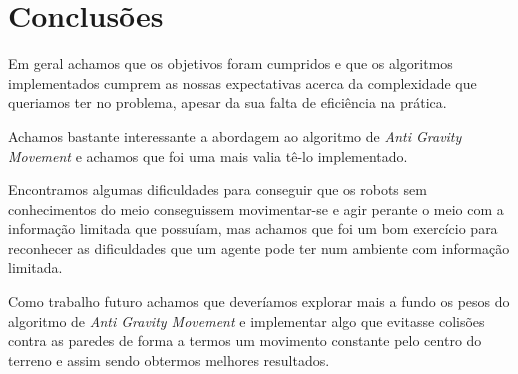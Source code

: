\chapter{Conclusões}

Em geral achamos que os objetivos foram cumpridos e que os algoritmos implementados cumprem as nossas expectativas acerca da complexidade que queriamos ter no problema, apesar da sua falta de eficiência na prática.

Achamos bastante interessante a abordagem ao algoritmo de \textit{Anti Gravity Movement} e achamos que foi uma mais valia tê-lo implementado.

Encontramos algumas dificuldades para conseguir que os robots sem conhecimentos do meio conseguissem movimentar-se e agir perante o meio com a informação limitada que possuíam, mas achamos que foi um bom exercício para reconhecer as dificuldades que um agente pode ter num ambiente com informação limitada.

Como trabalho futuro achamos que deveríamos explorar mais a fundo os pesos do algoritmo de \textit{Anti Gravity Movement} e implementar algo que evitasse colisões contra as paredes de forma a termos um movimento constante pelo centro do terreno e assim sendo obtermos melhores resultados.
